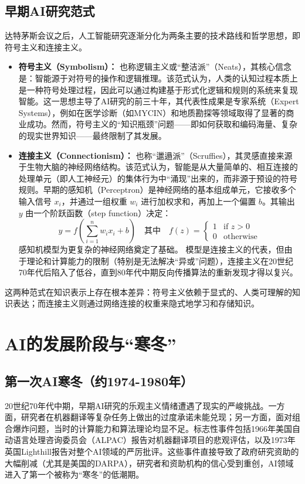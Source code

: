 \subsection{早期AI研究范式}
\label{ssec:early_paradigms}
达特茅斯会议之后，人工智能研究逐渐分化为两条主要的技术路线和哲学思想，即符号主义和连接主义。
\begin{itemize}
    \item \textbf{符号主义（Symbolism）：}\cite{jung2023concerning} 也称逻辑主义或“整洁派”（Neats），其核心信念是：智能源于对符号的操作和逻辑推理。该范式认为，人类的认知过程本质上是一种符号处理过程，因此可以通过构建基于形式化逻辑和规则的系统来复现智能。这一思想主导了AI研究的前三十年，其代表性成果是专家系统（Expert Systems），例如在医学诊断（如MYCIN）和地质勘探等领域取得了显著的商业成功。然而，符号主义的“知识瓶颈”问题——即如何获取和编码海量、复杂的现实世界知识——最终限制了其发展。
    \item \textbf{连接主义（Connectionism）：}\cite{maurer2021cognitive} 也称“邋遢派”（Scruffies），其灵感直接来源于生物大脑的神经网络结构。该范式认为，智能是从大量简单的、相互连接的处理单元（即人工神经元）的集体行为中“涌现”出来的，而非源于预设的符号规则。早期的感知机（Perceptron）是神经网络的基本组成单元，它接收多个输入信号 $x_i$，并通过一组权重 $w_i$ 进行加权求和，再加上一个偏置 $b$。其输出 $y$ 由一个阶跃函数（step function）决定：
    $$ y = f(\sum_{i=1}^{n} w_i x_i + b) \quad \text{其中} \quad f(z) = \begin{cases} 1 & \text{if } z > 0 \\ 0 & \text{otherwise} \end{cases} $$
    感知机模型为更复杂的神经网络奠定了基础。
    模型是连接主义的代表，但由于理论和计算能力的限制（特别是无法解决“异或”问题），连接主义在20世纪70年代后陷入了低谷，直到80年代中期反向传播算法的重新发现才得以复兴。
\end{itemize}
这两种范式在知识表示上存在根本差异：符号主义依赖于显式的、人类可理解的知识表达；而连接主义则通过网络连接的权重来隐式地学习和存储知识。

\section{AI的发展阶段与“寒冬”}
\label{sec:ai_stages_winters}

\subsection{第一次AI寒冬（约1974-1980年）}
\label{ssec:first_winter}
20世纪70年代中期，早期AI研究的乐观主义情绪遭遇了现实的严峻挑战。一方面，研究者在机器翻译等复杂任务上做出的过度承诺未能兑现；另一方面，面对组合爆炸问题，当时的计算能力和算法理论均显不足。标志性事件包括1966年美国自动语言处理咨询委员会（ALPAC）报告对机器翻译项目的悲观评估，以及1973年英国Lighthill报告对整个AI领域的严厉批评。这些事件直接导致了政府研究资助的大幅削减（尤其是美国的DARPA），研究者和资助机构的信心受到重创，AI领域进入了第一个被称为“寒冬”的低潮期。

